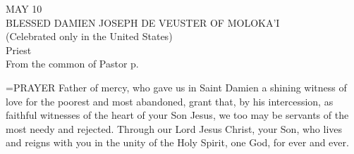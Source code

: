 \begin{center}\normalsize MAY 10\\
\footnotesize BLESSED DAMIEN JOSEPH DE VEUSTER OF MOLOKA’I\\
\footnotesize (Celebrated only in the United States)\\
\footnotesize Priest\\
\footnotesize From the common of Pastor p. \\
\end{center}

\hangindent=\parindent \small{PRAYER 
Father of mercy,
who gave us in Saint Damien
a shining witness of love for the poorest and most abandoned,
grant that, by his intercession,
as faithful witnesses of the heart of your Son Jesus,
we too may be servants of the most needy and rejected.
Through our Lord Jesus Christ, your Son,
who lives and reigns with you in the unity of the Holy Spirit,
one God, for ever and ever.\\}
 
